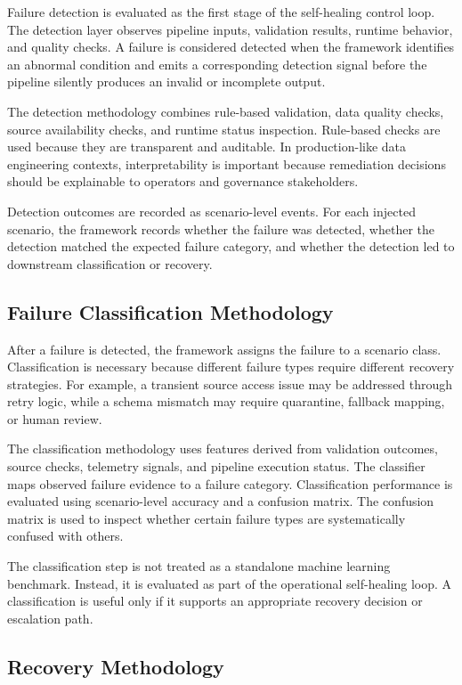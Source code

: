 Failure detection is evaluated as the first stage of the self-healing control loop. The detection layer observes pipeline inputs, validation results, runtime behavior, and quality checks. A failure is considered detected when the framework identifies an abnormal condition and emits a corresponding detection signal before the pipeline silently produces an invalid or incomplete output.

The detection methodology combines rule-based validation, data quality checks, source availability checks, and runtime status inspection. Rule-based checks are used because they are transparent and auditable. In production-like data engineering contexts, interpretability is important because remediation decisions should be explainable to operators and governance stakeholders.

Detection outcomes are recorded as scenario-level events. For each injected scenario, the framework records whether the failure was detected, whether the detection matched the expected failure category, and whether the detection led to downstream classification or recovery.

\subsection{Failure Classification Methodology}

After a failure is detected, the framework assigns the failure to a scenario class. Classification is necessary because different failure types require different recovery strategies. For example, a transient source access issue may be addressed through retry logic, while a schema mismatch may require quarantine, fallback mapping, or human review.

The classification methodology uses features derived from validation outcomes, source checks, telemetry signals, and pipeline execution status. The classifier maps observed failure evidence to a failure category. Classification performance is evaluated using scenario-level accuracy and a confusion matrix. The confusion matrix is used to inspect whether certain failure types are systematically confused with others.

The classification step is not treated as a standalone machine learning benchmark. Instead, it is evaluated as part of the operational self-healing loop. A classification is useful only if it supports an appropriate recovery decision or escalation path.

\subsection{Recovery Methodology}

